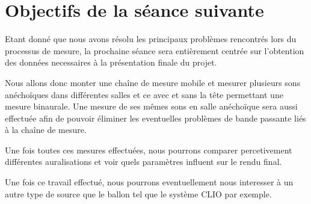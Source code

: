 \documentclass[12pt]{article}
\begin{document}
\section{Objectifs de la séance suivante} %

Etant donné que nous avons résolu les principaux problèmes rencontrés lors du processus de mesure, la prochaine séance sera entièrement centrée sur l'obtention des données necessaires à la présentation finale du projet. 

Nous allons donc monter une chaîne de mesure mobile et mesurer plusieurs sons anéchoïques dans différentes salles et ce avec et sans la tête permettant une mesure binaurale. Une mesure de ses mêmes sons en salle anéchoïque sera aussi effectuée afin de pouvoir éliminer les eventuelles problèmes de bande passante liés à la chaîne de mesure.

Une fois toutes ces mesures effectuées, nous pourrons comparer percetivement différentes auralisations et voir quels paramètres influent sur le rendu final. 

Une fois ce travail effectué, nous pourrons eventuellement nous interesser à un autre type de source que le ballon tel que le système CLIO par exemple.
\end{document}
